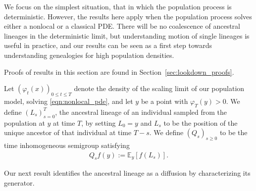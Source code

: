 \documentclass[EJP]{ejpecp} %
\newcommand{\IE}{\mathbb E}
\begin{document}
We focus on the simplest situation, that in which the population process is deterministic.
However, the results here apply when the population process solves 
either a nonlocal or a classical PDE.
There will be no 
coalescence of ancestral lineages in the deterministic limit,
but understanding motion of single lineages is useful in practice,
and our results can
be seen as a first step towards understanding genealogies for high population densities. 

Proofs of results in this section are found in Section~\ref{sec:lookdown_proofs}.

\begin{definition} 
\label{def:lineage_generator} 
    Let $(\varphi_t(x))_{0 \le t \le T}$
    denote the density of the scaling limit of our population model, 
solving \eqref{eqn:nonlocal_pde},
    and let $y$ be a point with $\varphi_T(y) > 0$.
    We define $(L_s)_{s=0}^T$,
    the ancestral lineage of an individual sampled from the
population at $y$ at time $T$, by setting $L_0=y$ and $L_s$
    to be the position of the unique ancestor of that individual at time $T - s$.
    We define
    $(Q_s)_{s \geq 0}$
    to be the time inhomogeneous semigroup satisfying
    \begin{align*}
        Q_s f(y) := \IE_y[ f(L_s) ] .
    \end{align*}
\end{definition}

Our next result identifies the ancestral lineage as a diffusion
by characterizing its generator.
\end{document}
